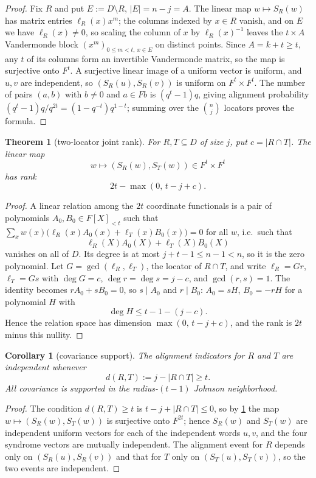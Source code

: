 \documentclass[11pt]{article}
\newtheorem{theorem}{Theorem}[section]
\newtheorem{corollary}[corollary]{Corollary}
\theoremstyle{definition}
\theoremstyle{remark}
\begin{document}
\begin{proof}
Fix $R$ and put $E:=D\setminus R$, $|E|=n-j=A$.  The linear map $w\mapsto S_R(w)$ has matrix entries $\ell_R(x)x^m$; the columns indexed by $x\in R$ vanish, and on $E$ we have $\ell_R(x)\ne0$, so scaling the column of $x$ by $\ell_R(x)^{-1}$ leaves the $t\times A$ Vandermonde block $(x^m)_{0\le m<t,\ x\in E}$ on distinct points.  Since $A=k+t\ge t$, any $t$ of its columns form an invertible Vandermonde matrix, so the map is surjective onto $F^t$.  A surjective linear image of a uniform vector is uniform, and $u,v$ are independent, so $(S_R(u),S_R(v))$ is uniform on $F^t\times F^t$.  The number of pairs $(a,b)$ with $b\ne0$ and $a\in Fb$ is $(q^t-1)q$, giving alignment probability $(q^t-1)q/q^{2t}=(1-q^{-t})q^{1-t}$; summing over the $\binom nj$ locators proves the formula.
\end{proof}

\begin{theorem}[two-locator joint rank]\label{thm:capf-joint-rank}
For $R,T\subseteq D$ of size $j$, put $c=|R\cap T|$.  The linear map
\[
        w\longmapsto (S_R(w),S_T(w))\in F^t\times F^t
\]
has rank
\[
        2t-\max(0,\,t-j+c).
\]
\end{theorem}

\begin{proof}
A linear relation among the $2t$ coordinate functionals is a pair of polynomials $A_0,B_0\in F[X]_{<t}$ such that $\sum_x w(x)\bigl(\ell_R(x)A_0(x)+\ell_T(x)B_0(x)\bigr)=0$ for all $w$, i.e.\ such that
\[
        \ell_R(X)A_0(X)+\ell_T(X)B_0(X)
\]
vanishes on all of $D$.  Its degree is at most $j+t-1\le n-1<n$, so it is the zero polynomial.  Let $G=\gcd(\ell_R,\ell_T)$, the locator of $R\cap T$, and write $\ell_R=Gr$, $\ell_T=Gs$ with $\deg G=c$, $\deg r=\deg s=j-c$, and $\gcd(r,s)=1$.  The identity becomes $rA_0+sB_0=0$, so $s\mid A_0$ and $r\mid B_0$: $A_0=sH$, $B_0=-rH$ for a polynomial $H$ with
\[
        \deg H\le t-1-(j-c).
\]
Hence the relation space has dimension $\max(0,\,t-j+c)$, and the rank is $2t$ minus this nullity.
\end{proof}

\begin{corollary}[covariance support]\label{cor:capf-covariance}
The alignment indicators for $R$ and $T$ are independent whenever
\[
        d(R,T):=j-|R\cap T|\ge t .
\]
All covariance is supported in the radius-$(t-1)$ Johnson neighborhood.
\end{corollary}

\begin{proof}
The condition $d(R,T)\ge t$ is $t-j+|R\cap T|\le0$, so by \cref{thm:capf-joint-rank} the map $w\mapsto(S_R(w),S_T(w))$ is surjective onto $F^{2t}$; hence $S_R(w)$ and $S_T(w)$ are independent uniform vectors for each of the independent words $u,v$, and the four syndrome vectors are mutually independent.  The alignment event for $R$ depends only on $(S_R(u),S_R(v))$ and that for $T$ only on $(S_T(u),S_T(v))$, so the two events are independent.
\end{proof}
\end{document}
